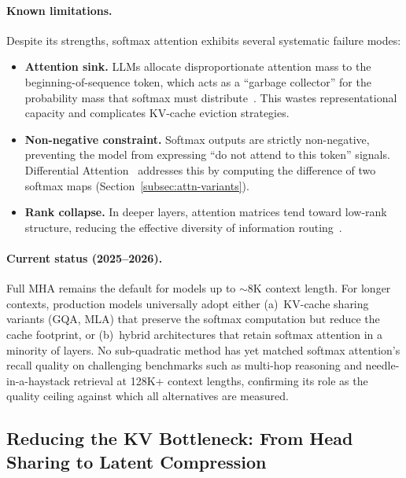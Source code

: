 \documentclass[11pt,a4paper]{article}
\begin{document}
\paragraph{Known limitations.}
Despite its strengths, softmax attention exhibits several systematic failure modes:
\begin{itemize}
\item \textbf{Attention sink.} LLMs allocate disproportionate attention mass to the beginning-of-sequence token, which acts as a ``garbage collector'' for the probability mass that softmax must distribute~\cite{xiao2023streamingllm}. This wastes representational capacity and complicates KV-cache eviction strategies.
\item \textbf{Non-negative constraint.} Softmax outputs are strictly non-negative, preventing the model from expressing ``do not attend to this token'' signals. Differential Attention~\cite{ye2024differential} addresses this by computing the difference of two softmax maps (Section~\ref{subsec:attn-variants}).
\item \textbf{Rank collapse.} In deeper layers, attention matrices tend toward low-rank structure, reducing the effective diversity of information routing~\cite{dong2021attention}.
\end{itemize}

\paragraph{Current status (2025--2026).}
Full MHA remains the default for models up to $\sim$8K context length. For longer contexts, production models universally adopt either (a)~KV-cache sharing variants (GQA, MLA) that preserve the softmax computation but reduce the cache footprint, or (b)~hybrid architectures that retain softmax attention in a minority of layers. No sub-quadratic method has yet matched softmax attention's recall quality on challenging benchmarks such as multi-hop reasoning and needle-in-a-haystack retrieval at 128K+ context lengths, confirming its role as the quality ceiling against which all alternatives are measured.


\subsection{Reducing the KV Bottleneck: From Head Sharing to Latent Compression}
\label{subsec:kv-opt}
\end{document}

